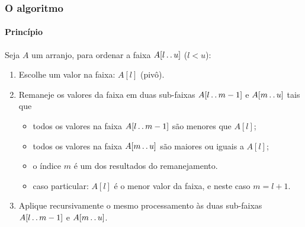\documentclass{beamer}
\begin{document}
\begin{frame}

  \frametitle{O algoritmo}
  \framesubtitle{Princípio}

  Seja $A$ um arranjo, para ordenar a faixa $A[l \mathinner{\ldotp\ldotp} u]$ ($l < u$):
  \begin{enumerate}
    \item Escolhe um valor na faixa: $A[l]$ (\alert{pivô\/}).
    \item Remaneje os valores da faixa em duas sub-faixas $A[l \mathinner{\ldotp\ldotp} m-1]$
      e $A[m \mathinner{\ldotp\ldotp} u]$ tais que
      \begin{itemize}
        \item todos os valores na faixa $A[l \mathinner{\ldotp\ldotp} m-1]$ são menores que $A[l]$;
        \item todos os valores na faixa $A[m \mathinner{\ldotp\ldotp} u]$ são maiores ou iguais a
          $A[l]$;
        \item o índice $m$ é um dos resultados do remanejamento.
        \item caso particular: $A[l]$ é o menor valor da faixa, e neste caso
          $m=l+1$.
      \end{itemize}
    \item Aplique recursivamente o mesmo processamento às duas sub-faixas
      $A[l \mathinner{\ldotp\ldotp} m-1]$ e $A[m \mathinner{\ldotp\ldotp} u]$.
  \end{enumerate}

\end{frame}
\end{document}

